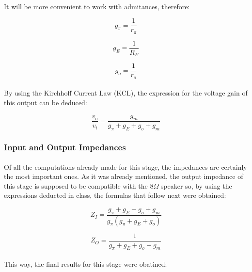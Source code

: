 \paragraph{}It will be more convenient to work with admitances, therefore:

\begin{equation}
    g_\pi=\frac{1}{r_\pi}
\end{equation}

\begin{equation}
    g_E=\frac{1}{R_E}
\end{equation}

\begin{equation}
    g_o=\frac{1}{r_o}
\end{equation}

\paragraph{}By using the Kirchhoff Current Law (KCL), the expression for the voltage gain of this output can be deduced:

\begin{equation}
    \frac{v_o}{v_i}=\frac{g_m}{g_\pi+g_E+g_o+g_m}
\end{equation}



\subsubsection{Input and Output Impedances}

\paragraph{}Of all the computations already made for this stage, the impedances are certainly the most important ones. As it was already mentioned, the output impedance of this stage is supposed to be compatible with the $8\Omega$ speaker so, by using the expressions deducted in class, the formulas that follow next were obtained:

\begin{equation}
    Z_I=\frac{g_\pi+g_E+g_o+g_m}{g_\pi(g_\pi+g_E+g_o)}
\end{equation}

\begin{equation}
    Z_O=\frac{1}{g_\pi+g_E+g_o+g_m}
\end{equation}


\paragraph{}This way, the final results for this stage were obatined:

